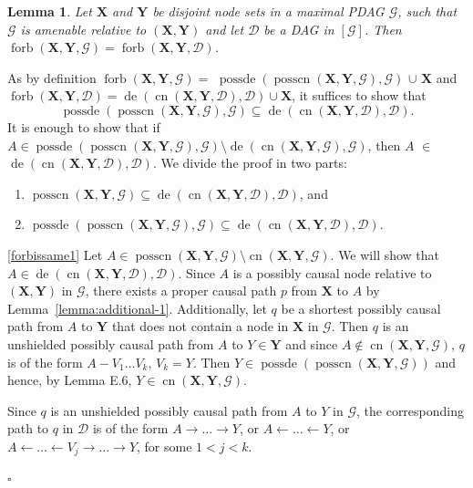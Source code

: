 \documentclass[11pt,a4paper]{article}
\newtheorem{Lemma}[Satz]{Lemma}
\theoremstyle{definition}
\theoremstyle{remark}
\newenvironment{proofof}[1][]{\begin{trivlist}
\item[\hskip \labelsep {\textit{Proof of #1.}}]}{\hfill{}$\square$\end{trivlist}}
\DeclareMathOperator{\Forbb}{forb}
\DeclareMathOperator{\de}{de}
\DeclareMathOperator{\possde}{possde}
\DeclareMathOperator{\CN}{cn}
\DeclareMathOperator{\possCN}{posscn}
\newcommand{\mpdag}{maximal PDAG}
\newcommand{\g}[1][G]{\mathcal{#1}}
\newcommand{\fb}[2][X,Y]{\Forbb(\mathbf{#1},#2)}
\newcommand{\cnb}[2][X,Y]{\CN(\mathbf{#1},#2)}
\newcommand{\posscnb}[2][X,Y]{\possCN(\mathbf{#1},#2)}
\begin{document}
\begin{Lemma}
	Let $\mathbf{X}$ and $\mathbf{Y}$ be disjoint node sets in a \mpdag{} $\g$, such that $\g$ is amenable relative to $(\mathbf{X,Y})$ and let $\g[D]$ be a DAG in $[\g]$. Then
	$\fb{\g} = \fb{\g[D]}$.
	\label{lemma:forbIsSame}
\end{Lemma}

\begin{proofof}[Lemma~\ref{lemma:forbIsSame}]
	As by definition $\fb{\g}=$ $\possde(\posscnb{\g},\g)$ $\cup$ $\mathbf{X}$ and $\fb{\g[D]}= \de(\cnb{\g[D]},\g[D]) \cup \mathbf{X}$, it suffices to show that \[\possde(\posscnb{\g},\g)\subseteq \de(\cnb{\g[D]},\g[D]).\]
	It is enough to show that if $A \in  \possde(\posscnb{\g},\g)\setminus \de(\cnb{\g},\g)$, then $A$ $\in$ $\de(\cnb{\g[D]},\g[D])$.
	We divide the proof in two parts:
	\begin{enumerate}[label = (\alph*)]
		\item\label{forbissame1} $\posscnb{\g} \subseteq \de(\cnb{\g[D]},\g[D])$, and
		\item\label{forbissame2} $\possde(\posscnb{\g},\g) \subseteq \de(\cnb{\g[D]},\g[D])$.
	\end{enumerate}
	
	\ref{forbissame1} Let $A \in \posscnb{\g} \setminus \cnb{\g}$. We will show that $A \in  \de(\cnb{\g[D]},\g[D])$.
	Since $A$ is a possibly causal node relative to $(\mathbf{X,Y})$ in $\g$, there exists a proper causal path $p$ from $\mathbf{X}$ to $A$  by Lemma~\ref{lemma:additional-1}. 
	Additionally, let $q$ be a shortest possibly causal path from $A$ to $\mathbf{Y}$ that does not contain a node in $\mathbf{X}$ in $\g$. Then $q$ is an unshielded possibly causal path from $A$ to $Y \in \mathbf{Y}$ and since $A \notin  \cnb{\g}$, $q$ is of the form $A - V_1 \dots V_k$, $V_k= Y$. Then $Y \in \possde(\posscnb{\g})$ and hence, by Lemma E.6, $Y \in \cnb{\g}$.
	
	Since $q$ is an unshielded possibly causal path from $A$ to $Y$ in $\g$, the corresponding path to $q$ in $\g[D]$ is of the form $A \rightarrow \dots \rightarrow Y$, or $A \leftarrow \dots \leftarrow Y$, or $A \leftarrow \dots \leftarrow V_j \rightarrow \dots \rightarrow Y$, for some $ 1 < j < k$. 
	

\end{proofof}
\end{document}
